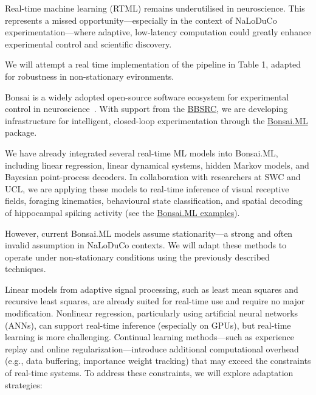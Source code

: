 Real-time machine learning (RTML) remains underutilised in neuroscience. This represents a missed opportunity—especially in the context of NaLoDuCo experimentation—where adaptive, low-latency computation could greatly enhance experimental control and scientific discovery.

We will attempt a real time implementation of the pipeline in Table 1, adapted for robustness in non-stationary evironments.


Bonsai is a widely adopted open-source software ecosystem for experimental
control in neuroscience~\cite{lopesEtAl15}. With support from the
\href{https://gow.bbsrc.ukri.org/grants/AwardDetails.aspx?FundingReference=BB\%2FW019132\%2F1}{BBSRC},
we are developing infrastructure for intelligent, closed-loop experimentation
through the \href{https://bonsai-rx.org/machinelearning/}{Bonsai.ML} package.

We have already integrated several real-time ML models into Bonsai.ML,
including linear regression, linear dynamical systems, hidden Markov models,
and Bayesian point-process decoders. In collaboration with researchers at SWC
and UCL, we are applying these models to real-time inference of visual
receptive fields, foraging kinematics, behavioural state classification, and
spatial decoding of hippocampal spiking activity (see the
\href{https://bonsai-rx.org/machinelearning/examples/README.html}{Bonsai.ML examples}).

However, current Bonsai.ML models assume stationarity—a strong and often
invalid assumption in NaLoDuCo contexts. We will adapt these methods to operate
under non-stationary conditions using the previously described techniques.

Linear models from adaptive signal processing, such as least mean squares and
recursive least squares, are already suited for real-time use and require no
major modification. Nonlinear regression, particularly using artificial neural
networks (ANNs), can support real-time inference (especially on GPUs), but
real-time learning is more challenging. Continual learning methods—such as
experience replay and online regularization—introduce additional computational
overhead (e.g., data buffering, importance weight tracking) that may exceed the
constraints of real-time systems. To address these constraints, we will explore
adaptation strategies:

